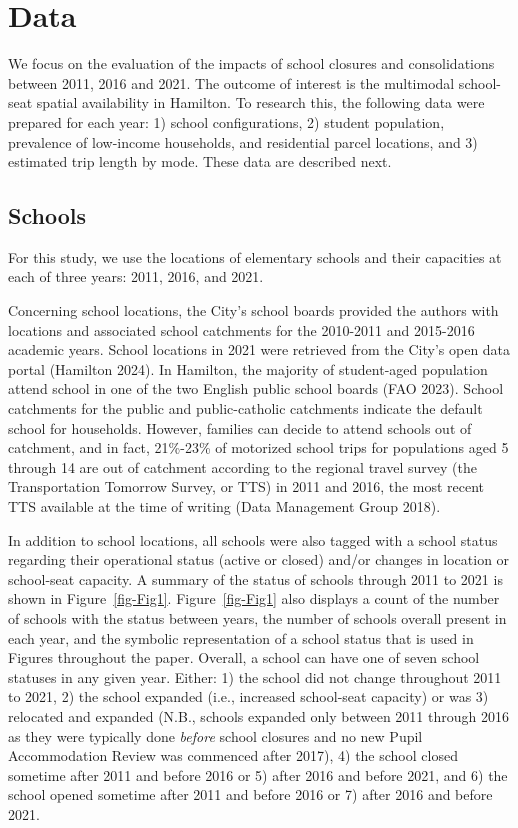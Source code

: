 \documentclass[
default
]{sn-jnl}
\begin{document}
\section{Data}\label{data}

We focus on the evaluation of the impacts of school closures and
consolidations between 2011, 2016 and 2021. The outcome of interest is
the multimodal school-seat spatial availability in Hamilton. To research
this, the following data were prepared for each year: 1) school
configurations, 2) student population, prevalence of low-income
households, and residential parcel locations, and 3) estimated trip
length by mode. These data are described next.

\subsection{Schools}\label{schools}

For this study, we use the locations of elementary schools and their
capacities at each of three years: 2011, 2016, and 2021.

Concerning school locations, the City's school boards provided the
authors with locations and associated school catchments for the
2010-2011 and 2015-2016 academic years. School locations in 2021 were
retrieved from the City's open data portal (Hamilton 2024). In Hamilton,
the majority of student-aged population attend school in one of the two
English public school boards (FAO 2023). School catchments for the
public and public-catholic catchments indicate the default school for
households. However, families can decide to attend schools out of
catchment, and in fact, 21\%-23\% of motorized school trips for
populations aged 5 through 14 are out of catchment according to the
regional travel survey (the Transportation Tomorrow Survey, or TTS) in
2011 and 2016, the most recent TTS available at the time of writing
(Data Management Group 2018).

In addition to school locations, all schools were also tagged with a
school status regarding their operational status (active or closed)
and/or changes in location or school-seat capacity. A summary of the
status of schools through 2011 to 2021 is shown in
Figure~\ref{fig-Fig1}. Figure~\ref{fig-Fig1} also displays a count of
the number of schools with the status between years, the number of
schools overall present in each year, and the symbolic representation of
a school status that is used in Figures throughout the paper. Overall, a
school can have one of seven school statuses in any given year. Either:
1) the school did not change throughout 2011 to 2021, 2) the school
expanded (i.e., increased school-seat capacity) or was 3) relocated and
expanded (N.B., schools expanded only between 2011 through 2016 as they
were typically done \emph{before} school closures and no new Pupil
Accommodation Review was commenced after 2017), 4) the school closed
sometime after 2011 and before 2016 or 5) after 2016 and before 2021,
and 6) the school opened sometime after 2011 and before 2016 or 7) after
2016 and before 2021.
\end{document}
